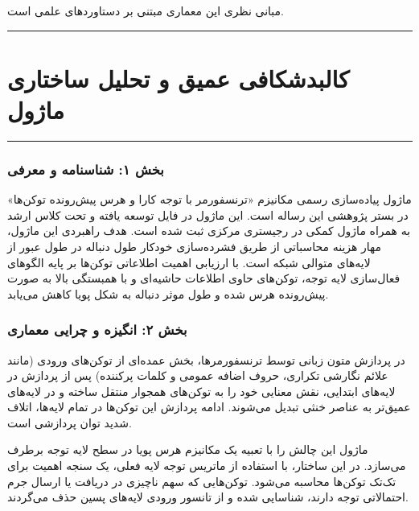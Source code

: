 \clearpage
{}
\vspace*{0.2cm}

مبانی نظری این معماری مبتنی بر دستاوردهای علمی \cite{kim2022learned} است.
\noindent\rule{\textwidth}{1.2pt}
\vspace*{0.1cm}
\section{کالبدشکافی عمیق و تحلیل ساختاری ماژول }
\label{sec:mod_eat_attention}
\vspace*{-0.2cm}
\noindent\rule{\textwidth}{0.5pt}
\vspace*{0.3cm}

\subsubsection*{بخش ۱: شناسنامه و معرفی }
ماژول  پیاده‌سازی رسمی مکانیزم «ترنسفورمر با توجه کارا و هرس پیش‌رونده توکن‌ها»  در بستر پژوهشی این رساله است. این ماژول در فایل  توسعه یافته و تحت کلاس ارشد  به همراه ماژول کمکی  در رجیستری مرکزی ثبت شده است.
هدف راهبردی این ماژول، مهار هزینه محاسباتی از طریق فشرده‌سازی خودکار طول دنباله در طول عبور از لایه‌های متوالی شبکه است. با ارزیابی اهمیت اطلاعاتی توکن‌ها بر پایه الگوهای فعال‌سازی لایه توجه، توکن‌های حاوی اطلاعات حاشیه‌ای و با همبستگی بالا به صورت پیش‌رونده هرس شده و طول موثر دنباله به شکل پویا کاهش می‌یابد.

\subsubsection*{بخش ۲: انگیزه و چرایی معماری }
در پردازش متون زبانی توسط ترنسفورمرها، بخش عمده‌ای از توکن‌های ورودی (مانند علائم نگارشی تکراری، حروف اضافه عمومی و کلمات پرکننده) پس از پردازش در لایه‌های ابتدایی، نقش معنایی خود را به توکن‌های همجوار منتقل ساخته و در لایه‌های عمیق‌تر به عناصر خنثی تبدیل می‌شوند. ادامه پردازش این توکن‌ها در تمام لایه‌ها، اتلاف شدید توان پردازشی است.

ماژول  این چالش را با تعبیه یک مکانیزم هرس پویا در سطح لایه توجه برطرف می‌سازد. در این ساختار، با استفاده از ماتریس توجه لایه فعلی، یک سنجه اهمیت  برای تک‌تک توکن‌ها محاسبه می‌شود. توکن‌هایی که سهم ناچیزی در دریافت یا ارسال جرم احتمالاتی توجه دارند، شناسایی شده و از تانسور ورودی لایه‌های پسین حذف می‌گردند.


